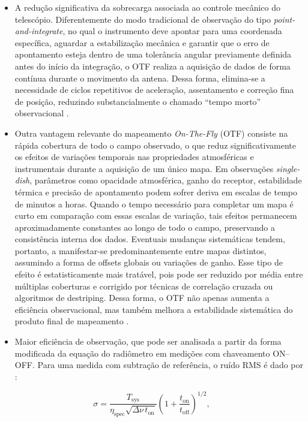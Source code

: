 \begin{itemize}
\item A redução significativa da sobrecarga associada ao controle mecânico do telescópio. Diferentemente do modo tradicional de observação do tipo \textit{point-and-integrate}, no qual o instrumento deve apontar para uma coordenada específica, aguardar a estabilização mecânica e garantir que o erro de apontamento esteja dentro de uma tolerância angular previamente definida antes do início da integração, o OTF realiza a aquisição de dados de forma contínua durante o movimento da antena. Dessa forma, elimina-se a necessidade de ciclos repetitivos de aceleração, assentamento e correção fina de posição, reduzindo substancialmente o chamado “tempo morto” observacional \cite{MangumEmersonGreisen2007_on_the_fly, thompson2017interferometry}.
\item Outra vantagem relevante do mapeamento \textit{On-The-Fly} (OTF) consiste na rápida cobertura de todo o campo observado, o que reduz significativamente os efeitos de variações temporais nas propriedades atmosféricas e instrumentais durante a aquisição de um único mapa. Em observações \textit{single-dish}, parâmetros como opacidade atmosférica, ganho do receptor, estabilidade térmica e precisão de apontamento podem sofrer deriva em escalas de tempo de minutos a horas. Quando o tempo necessário para completar um mapa é curto em comparação com essas escalas de variação, tais efeitos permanecem aproximadamente constantes ao longo de todo o campo, preservando a consistência interna dos dados. Eventuais mudanças sistemáticas tendem, portanto, a manifestar-se predominantemente entre mapas distintos, assumindo a forma de offsets globais ou variações de ganho. Esse tipo de efeito é estatisticamente mais tratável, pois pode ser reduzido por média entre múltiplas coberturas e corrigido por técnicas de correlação cruzada ou algoritmos de destriping. Dessa forma, o OTF não apenas aumenta a eficiência observacional, mas também melhora a estabilidade sistemática do produto final de mapeamento \cite{MangumEmersonGreisen2007_on_the_fly, thompson2017interferometry}.
\item Maior eficiência de observação, que pode ser analisada a partir da forma modificada da equação do radiômetro em medições com chaveamento ON--OFF. Para uma medida com subtração de referência, o ruído RMS é dado por \cite{MangumEmersonGreisen2007_on_the_fly}:
\end{itemize}

\begin{equation}
\sigma = 
\frac{T_{\mathrm{sys}}}
{\eta_{\mathrm{spec}}\sqrt{\Delta\nu\, t_{\mathrm{on}}}}
\left(1 + \frac{t_{\mathrm{on}}}{t_{\mathrm{off}}}\right)^{1/2},
\end{equation}

